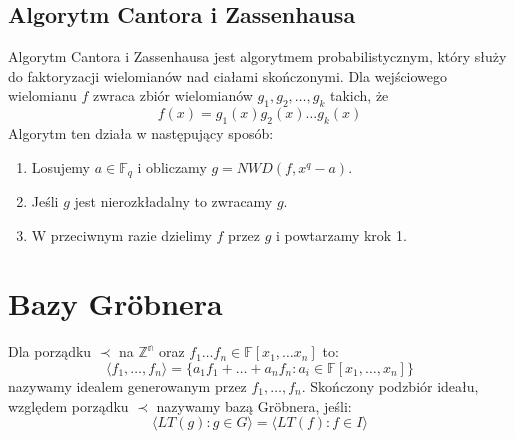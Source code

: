 \documentclass{../notatki}
\begin{document}
\subsection{Algorytm Cantora i Zassenhausa}

Algorytm Cantora i Zassenhausa jest algorytmem probabilistycznym, który
służy do faktoryzacji wielomianów nad ciałami skończonymi. Dla wejściowego
wielomianu $f$ zwraca zbiór wielomianów $g_1, g_2, \dots, g_k$ takich, że
$$
f(x) = g_1(x)g_2(x) \dots g_k(x)
$$
Algorytm ten działa w następujący sposób:
\begin{enumerate}
  \item Losujemy $a \in \mathbb{F}_q$ i obliczamy $g = NWD(f, x^q - a)$.
  \item Jeśli $g$ jest nierozkładalny to zwracamy $g$.
  \item W przeciwnym razie dzielimy $f$ przez $g$ i powtarzamy krok 1.
\end{enumerate}

\section{Bazy Gröbnera}

Dla porządku $\prec$ na $\mathbb{Z^n}$ oraz $f_1 \dots f_n \in
\mathbb{F}[x_1, \dots x_n]$ to:
$$
\langle f_1, \dots, f_n \rangle = \{a_1f_1 + \dots + a_nf_n : a_i \in
\mathbb{F}[x_1, \dots, x_n]\}
$$
nazywamy idealem generowanym przez $f_1, \dots, f_n$. Skończony podzbiór ideału,
względem porządku $\prec$ nazywamy bazą Gröbnera, jeśli:
$$
\langle LT(g) : g \in G \rangle = \langle LT(f) : f \in I \rangle
$$
\end{document}
